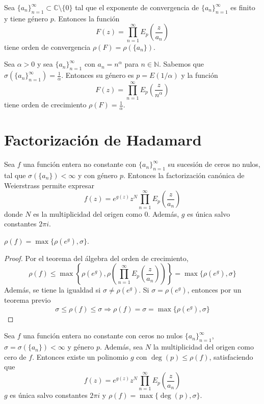 \begin{theorem}
    Sea $\{a_n\}_{n=1}^\infty \subset \mathbb{C} \setminus \{0\}$ tal que el exponente de convergencia de $\{a_n\}_{n=1}^\infty$ es finito y tiene género $p$.
    Entonces la función
    $$F(z) = \prod_{n=1}^\infty E_p\left(\frac{z}{a_n}\right)$$
    tiene orden de convergencia $\rho(F) = \rho(\{a_n\})$.
\end{theorem}

\begin{example}
    Sea $\alpha > 0$ y sea $\{a_n\}_{n=1}^\infty$ con $a_n = n^\alpha$ para $n \in \mathbb{N}$.
    Sabemos que $\sigma(\{a_n\}_{n=1}^\infty) = \frac{1}{\alpha}$.
    Entonces su género es $p = E(1/\alpha)$ y la función
    $$F(z) = \prod_{n=1}^\infty E_p\left(\frac{z}{n^\alpha}\right)$$
    tiene orden de crecimiento $\rho(F) = \frac{1}{\alpha}$.
\end{example}

\section{Factorización de Hadamard}
Sea $f$ una función entera no constante con $\{a_n\}_{n=1}^\infty$ su sucesión de ceros no nulos, tal que $\sigma(\{a_n\}) < \infty$ y con género $p$.
Entonces la factorización canónica de Weierstrass permite expresar
$$f(z) = e^{g(z)}z^N \prod_{n=1}^\infty E_p\left(\frac{z}{a_n}\right)$$
donde $N$ es la multiplicidad del origen como 0.
Además, $g$ es única salvo constantes $2\pi i$.

\begin{proposition}
    $\rho(f) = \max\{\rho(e^g), \sigma\}$.
\end{proposition}

\begin{proof}
    Por el teorema del álgebra del orden de crecimiento,
    $$\rho(f) \leq \max\left\{\rho(e^g), \rho\left(\prod_{n=1}^\infty E_p\left(\frac{z}{a_n}\right)\right)\right\} = \max\{\rho(e^g), \sigma\}$$
    Además, se tiene la igualdad si $\sigma \neq \rho(e^g)$.
    Si $\sigma = \rho(e^g)$, entonces por un teorema previo
    $$\sigma \leq \rho(f) \leq \sigma \Rightarrow \rho(f) = \sigma = \max\{\rho(e^g), \sigma\}$$
\end{proof}

\begin{theorem}
    Sea $f$ una función entera no constante con ceros no nulos $\{a_n\}_{n=1}^\infty$, $\sigma = \sigma(\{a_n\}) < \infty$ y género $p$.
    Además, sea $N$ la multiplicidad del origen como cero de $f$.
    Entonces existe un polinomio $g$ con $\deg(p) \leq \rho(f)$, satisfaciendo que
    $$f(z) = e^{g(z)}z^N \prod_{n=1}^\infty E_p\left(\frac{z}{a_n}\right)$$
    $g$ es única salvo constantes $2\pi i$ y $\rho(f) = \max\{\deg(p), \sigma\}$.
\end{theorem}

